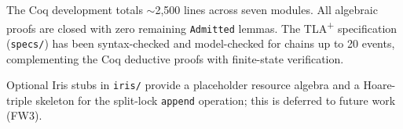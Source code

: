 The Coq development totals $\sim$2,500 lines across seven modules. All algebraic proofs are closed with zero remaining \texttt{Admitted} lemmas. The TLA\textsuperscript{+} specification (\texttt{specs/}) has been syntax-checked and model-checked for chains up to 20 events, complementing the Coq deductive proofs with finite-state verification.

Optional Iris stubs in \texttt{iris/} provide a placeholder resource algebra and a Hoare-triple skeleton for the split-lock \texttt{append} operation; this is deferred to future work (FW3).
